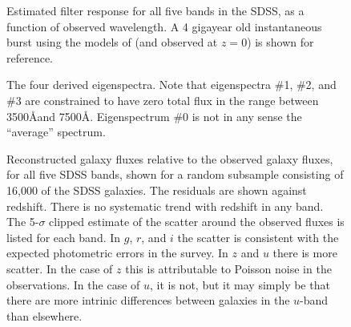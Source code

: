\clearpage

\setcounter{thefigs}{0}

\clearpage
{}
\begin{figure}
\figurenum{\fignum}
\caption{\label{response_sdss} Estimated filter response for all five
bands in the SDSS, as a function of observed wavelength. A 4 gigayear
old instantaneous burst using the models of \citet{bruzual93a} (and
observed at $z=0$) is shown for reference.}
\end{figure}

\clearpage
{}
\begin{figure}
\figurenum{\fignum}
\caption{\label{k_espec_plot} The four derived eigenspectra. Note that
eigenspectra \#1, \#2, and \#3 are constrained to have zero total flux in the
range between 3500\AA and 7500\AA. Eigenspectrum \#0 is not in any
sense the ``average'' spectrum. }
\end{figure}

\clearpage
{}
\begin{figure}
\figurenum{\fignum}
\caption{\label{k_model_plot} Reconstructed galaxy fluxes relative to
the observed galaxy fluxes, for all five SDSS bands, shown for a
random subsample consisting of 16,000 of the SDSS galaxies. The
residuals are shown against redshift.  There is no systematic trend
with redshift in any band. The 5-$\sigma$ clipped estimate of the
scatter around the observed fluxes is listed for each band. In $g$,
$r$, and $i$ the scatter is consistent with the expected photometric
errors in the survey. In $z$ and $u$ there is more scatter. In the
case of $z$ this is attributable to Poisson noise in the
observations. In the case of $u$, it is not, but it may simply be that
there are more intrinic differences between galaxies in the $u$-band
than elsewhere.}
\end{figure}

